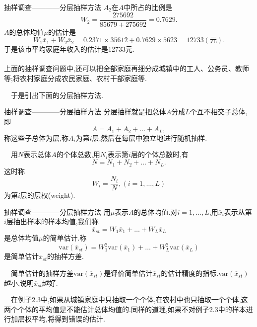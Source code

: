 \begin{frame}{抽样调查————分层抽样方法}
$A_2$在$A$中所占的比例是
\begin{equation*}
W_2 = \frac{275692}{85679+275692} = 0.7629.
\end{equation*}
$A$的总体均值$\mu$的估计是
\begin{equation*}
W_1\overline{x}_1 + W_2\overline{x}_2 = 0.2371\times 35612 + 0.7629\times 5623 = 12733(\text{元}).
\end{equation*}
于是该市平均家庭年收入的估计是12733元.
\\ \hspace*{\fill} \\
上面的抽样调查问题中,还可以把全部家庭再细分成城镇中的工人、公务员、教师等;将农村家庭分成农民家庭、农村干部家庭等.

$\quad$于是引出下面的分层抽样方法.
\end{frame}

\begin{frame}{抽样调查————分层抽样方法}
\alert{分层抽样}就是把总体$A$分成$L$个互不相交子总体,即
\begin{equation}
A = A_1+A_2+\dots+A_L,
\end{equation}
称这些子总体为层,称$A_i$为第$i$层,然后在每层中独立地进行随机抽样.

$\quad$用$N$表示总体$A$的个体总数,用$N_i$表示第$i$层的个体总数时,有
\begin{equation}
N = N_1+N_2+\dots+N_L.
\end{equation}
这时称
\begin{equation}
W_i = \frac{N_i}{N},(i = 1,\dots,L)
\end{equation}
为第$i$层的层权(weight).

\end{frame}

\begin{frame}{抽样调查————分层抽样方法}
用$\mu$表示$A$的总体均值.对$i = 1,\dots,L$,用$\overline{x}_i$表示从第$i$层抽出样本的样本均值,我们称
\begin{equation}
\overline{x}_{st} = W_1\overline{x}_1 + \dots + W_L\overline{x}_L
\end{equation}
是总体均值$\mu$的\alert{简单估计}.称
\begin{equation}
\mathrm{var}(\overline{x}_{st}) = W_1^2\mathrm{var}(\overline{x}_1) + \dots + W_L^2\mathrm{var}(\overline{x}_L)
\end{equation}
是简单估计$\overline{x}_{st}$的抽样方差.

$\quad$简单估计的抽样方差$\mathrm{var}(\overline{x}_{st})$是评价简单估计$\overline{x}_{st}$的估计精度的指标.$\mathrm{var}(\overline{x}_{st})$越小,说明$\overline{x}_{st}$越好.

$\quad$在例子2.3中,如果从城镇家庭中只抽取一个个体,在农村中也只抽取一个个体,这两个个体的平均值是不能估计总体均值的.同样的道理,如果不对例子2.3中的样本进行加层权平均,将得到错误的估计.
\end{frame}

